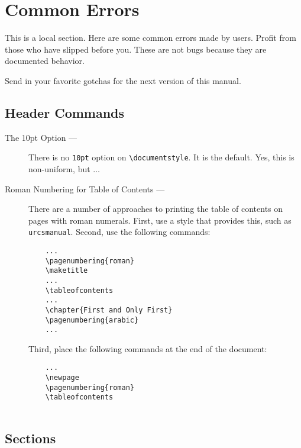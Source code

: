 \section{Common Errors}

This is a local section. Here are some common errors made by users.
Profit from those who have slipped before you.  These are not bugs
because they are documented behavior.

Send in your favorite gotchas for the next version of this manual.

\subsection{Header Commands}

\begin{description}

\item[The 10pt Option ---]
There is no \verb|10pt| option on \verb|\documentstyle|. It
is the default. Yes, this is non-uniform, but $\ldots$

\item[Roman Numbering for Table of Contents ---]
There are a number of approaches to
printing the table of contents on pages with roman numerals.
First, use a style that provides this, such as {\tt urcsmanual}.
Second, use the following commands:
\begin{verbatim}
    ...
    \pagenumbering{roman}
    \maketitle
    ...
    \tableofcontents
    ...
    \chapter{First and Only First}
    \pagenumbering{arabic}
    ...
\end{verbatim}
Third, place the following commands at the end of the document:
\begin{verbatim}
    ...
    \newpage
    \pagenumbering{roman}
    \tableofcontents
    
\end{verbatim}

\end{description}

\subsection{Sections}

